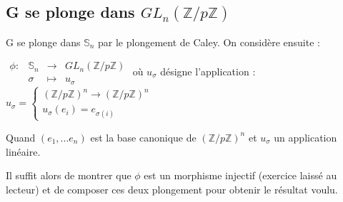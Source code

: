 \documentclass{report}
\newcommand{\fonction}[5]{
    \begin{array}{l|rcl}
    #1: & #2 & \longrightarrow & #3 \\
        & #4 & \longmapsto & #5 
    \end{array}
}
\newcommand{\Z}{\mathbb{Z}}
\newcommand{\sn}{\mathbb{S}_n}
\newcommand{\dsp}{\displaystyle}
\begin{document}
\subsection*{G se plonge dans $GL_n(\Z / p\Z)$}

G se plonge dans $\sn$ par le plongement de Caley. On considère ensuite :
\begin{center}
$\dsp \fonction{\phi}{\sn}{GL_n \left( \Z / p\Z \right)}{\sigma}{u_{\sigma}}$ où $u_{\sigma}$ désigne l'application : $u_\sigma = \left\{
            \begin{array}{ll}
                \left( \Z /p\Z \right) ^n \longrightarrow \left( \Z /p\Z \right) ^n& \\
                u_\sigma (e_i)=e_{\sigma(i)}& 
            \end{array}
        \right.$
\end{center}
Quand $(e_1, ...e_n) $  est la base canonique de $\left( \Z / p\Z \right) ^n$ et $u_{\sigma}$ un application linéaire.\par Il suffit alors de montrer que $\phi$ est un morphisme injectif (exercice laissé au lecteur) et de composer ces deux plongement pour obtenir le résultat voulu.
\end{document}
